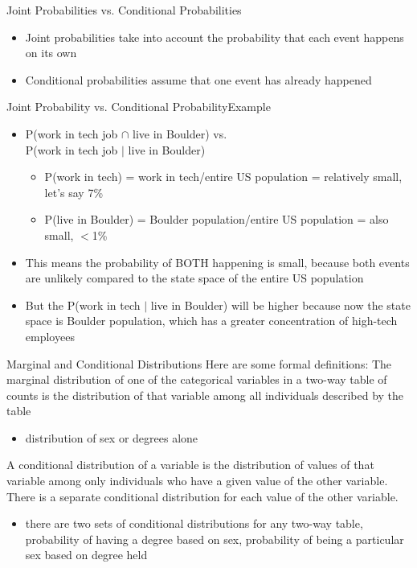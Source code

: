 \documentclass{beamer}
\begin{document}
\begin{frame}{Joint Probabilities vs. Conditional Probabilities}
	\begin{itemize}
		\item Joint probabilities take into account the probability that each event happens on its own
		\item Conditional probabilities assume that one event has already happened
	\end{itemize}
\end{frame}

\begin{frame}{Joint Probability vs. Conditional Probability}{Example}
	\begin{itemize}
		\item P(work in tech job $\cap$ live in Boulder) vs. \\ P(work in tech job $\vert$ live in Boulder)
		      \begin{itemize}
		      	\item P(work in tech) = work in tech/entire US population = relatively small, let's say 7\%
		      	\item P(live in Boulder) = Boulder population/entire US population = also small, $<$1\%
		      \end{itemize}
		\item This means the probability of BOTH happening is small, because both events are unlikely compared to the state space of the entire US population
		\item But the P(work in tech $\vert$ live in Boulder) will be higher because now the state space is Boulder population, which has a greater concentration of high-tech employees
	\end{itemize}
\end{frame}

\begin{frame}{Marginal and Conditional Distributions}
	Here are some formal definitions:
	The \alert{\small{marginal distribution}} of one of the categorical variables in a two-way table of counts is the \alert{\small{distribution of that variable among all individuals described by the table}}
	\begin{itemize}
		\item distribution of sex or degrees alone
	\end{itemize}
	
	A \alert{\small{conditional distribution}} of a variable is the \alert{\small{distribution of values of that variable among only individuals who have a given value of the other variable}}. There is a separate conditional distribution for each value of the other variable. 
	\begin{itemize}
		\item there are two sets of conditional distributions for any two-way table, probability of having a degree based on sex, probability of being a particular sex based on degree held
	\end{itemize}
\end{frame}
\end{document}
